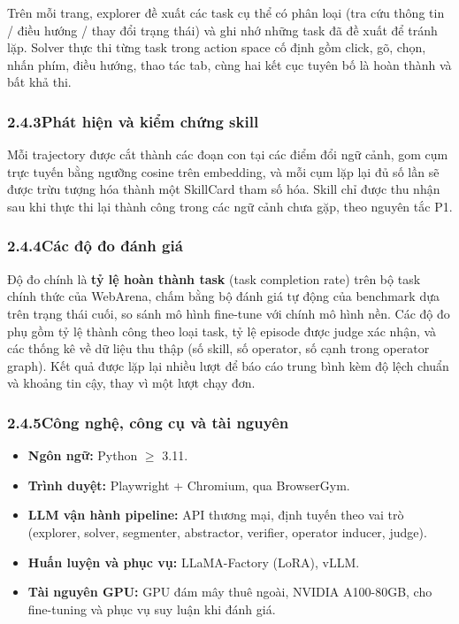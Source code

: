 Trên mỗi trang, explorer đề xuất các task cụ thể có phân loại (tra cứu thông
tin / điều hướng / thay đổi trạng thái) và ghi nhớ những task đã đề xuất để
tránh lặp. Solver thực thi từng task trong action space cố định gồm click, gõ,
chọn, nhấn phím, điều hướng, thao tác tab, cùng hai kết cục tuyên bố là hoàn
thành và bất khả thi.

\subsubsection*{2.4.3\quad Phát hiện và kiểm chứng skill}

Mỗi trajectory được cắt thành các đoạn con tại các điểm đổi ngữ cảnh, gom cụm
trực tuyến bằng ngưỡng cosine trên embedding, và mỗi cụm lặp lại đủ số lần sẽ
được trừu tượng hóa thành một SkillCard tham số hóa. Skill chỉ được thu nhận
sau khi thực thi lại thành công trong các ngữ cảnh chưa gặp, theo nguyên tắc P1.

\subsubsection*{2.4.4\quad Các độ đo đánh giá}

Độ đo chính là \textbf{tỷ lệ hoàn thành task} (task completion rate) trên bộ
task chính thức của WebArena, chấm bằng bộ đánh giá tự động của benchmark dựa
trên trạng thái cuối, so sánh mô hình fine-tune với chính mô hình nền. Các độ
đo phụ gồm tỷ lệ thành công theo loại task, tỷ lệ episode được judge xác nhận,
và các thống kê về dữ liệu thu thập (số skill, số operator, số cạnh trong
operator graph). Kết quả được lặp lại nhiều lượt để báo cáo trung bình kèm độ
lệch chuẩn và khoảng tin cậy, thay vì một lượt chạy đơn.

\subsubsection*{2.4.5\quad Công nghệ, công cụ và tài nguyên}

\begin{itemize}
  \item \textbf{Ngôn ngữ:} Python $\geq$ 3.11.
  \item \textbf{Trình duyệt:} Playwright + Chromium, qua BrowserGym.
  \item \textbf{LLM vận hành pipeline:} API thương mại, định tuyến theo vai
  trò (explorer, solver, segmenter, abstractor, verifier, operator inducer,
  judge).
  \item \textbf{Huấn luyện và phục vụ:} LLaMA-Factory (LoRA), vLLM.
  \item \textbf{Tài nguyên GPU:} GPU đám mây thuê ngoài, NVIDIA A100-80GB, cho
  fine-tuning và phục vụ suy luận khi đánh giá.
\end{itemize}

